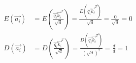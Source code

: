 \begin{align*}
E(\vec{a_i}) &= E(\frac{\vec{q_i}\vec{k_i}^T}{\sqrt{d}}) = \frac{E(\vec{q_i}\vec{k_i}^T)}{\sqrt{d}} = \frac{0}{\sqrt{d}} = 0 \\
D(\vec{a_i}) &= D(\frac{\vec{q_i}\vec{k_i}^T}{\sqrt{d}}) = \frac{D(\vec{q_i}\vec{k_i}^T)}{(\sqrt{d})^2} = \frac{d}{d} = 1
\end{align*}